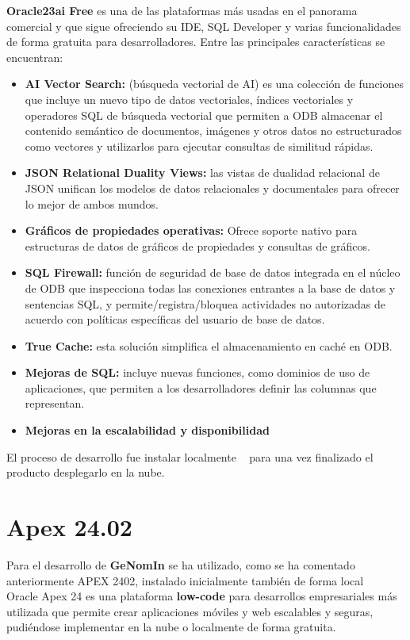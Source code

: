 \textbf{Oracle23ai Free} es una de las plataformas más usadas en el panorama comercial y que sigue ofreciendo su \acrshort{IDE}, SQL Developer y varias funcionalidades de forma gratuita para desarrolladores.
Entre las principales características se encuentran:
\begin{itemize}
	\item \textbf{AI Vector Search:} (búsqueda vectorial de AI) es una colección de funciones que incluye un nuevo tipo de datos vectoriales, índices vectoriales y operadores SQL de búsqueda vectorial que permiten a \acrfull{ODB} almacenar el contenido semántico de documentos, imágenes y otros datos no estructurados como vectores y utilizarlos para ejecutar consultas de similitud rápidas.
	\item \textbf{JSON Relational Duality Views:} las vistas de dualidad relacional de JSON unifican los modelos de datos relacionales y documentales para ofrecer lo mejor de ambos mundos.
	\item \textbf{Gráficos de propiedades operativas:} Ofrece soporte nativo para estructuras de datos de gráficos de propiedades y consultas de gráficos.
	\item \textbf{SQL Firewall:} función de seguridad de base de datos integrada en el núcleo de \acrfull{ODB} que inspecciona todas las conexiones entrantes a la base de datos y sentencias SQL, y permite/registra/bloquea actividades no autorizadas de acuerdo con políticas específicas del usuario de base de datos.
	\item \textbf{True Cache:} esta solución simplifica el almacenamiento en caché en \acrfull{ODB}.
	\item \textbf{Mejoras de SQL:} incluye nuevas funciones, como dominios de uso de aplicaciones, que permiten a los desarrolladores definir las columnas que representan.
	\item \textbf{Mejoras en la escalabilidad y disponibilidad}
\end{itemize}

El proceso de desarrollo fue instalar localmente ~\cite{DattaInstallingOracleDatabasea} para una vez finalizado el producto desplegarlo en la nube.

\section{Apex 24.02} \label{sec: apex}
Para el desarrollo de \textbf{GeNomIn} se ha utilizado, como se ha comentado anteriormente \acrshort{APEX} 2402, instalado inicialmente también de forma local ~\cite{JenningsInstallingConfiguringAPEX}
Oracle Apex 24 es una plataforma \textbf{low-code} para desarrollos empresariales más utilizada que permite crear aplicaciones móviles y web escalables y seguras, pudiéndose implementar en la nube o localmente de forma gratuita.

